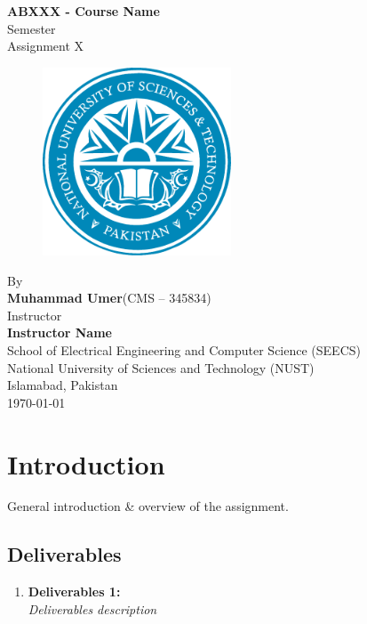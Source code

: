 \documentclass[11pt,a4paper]{article}
\begin{document}
\newpage
\begin{titlepage}
    \vspace*{\fill} %
    \centering
    \huge{\textbf{ABXXX - Course Name}} \\ [0.75cm]
    \huge{Semester} \\
    \huge{Assignment X} \\ [0.75cm]
    \begin{figure}[ht!]
        \centering
        \includegraphics[width=0.5\textwidth]{nust.pdf}
    \end{figure}
    \vspace {0.75cm}
    \Large{By} \\
    \Large{\textbf{Muhammad Umer}\quad(CMS -- 345834)} \\ [0.75cm]
    \Large{Instructor} \\
    \Large{\textbf{Instructor Name}} \\[0.75cm]
    \Large{School of Electrical Engineering and Computer Science (SEECS) \\
        National University of Sciences and Technology (NUST) \\
        Islamabad, Pakistan} \\ [0.75cm]
    \Large{\today} %
    \vspace*{\fill} %
\end{titlepage}

\tableofcontents

\newpage
\setcounter{page}{1}
\section{Introduction}
General introduction \& overview of the assignment.

\subsection*{Deliverables}
\begin{enumerate}[leftmargin=*]
    \item \textbf{Deliverables 1:} \textit{\\Deliverables description}
\end{enumerate}
\end{document}
